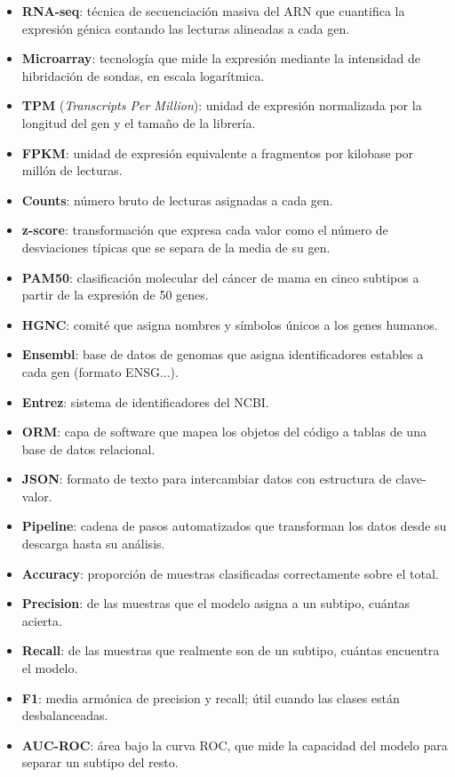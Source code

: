 \documentclass[12pt, a4paper]{report}
\begin{document}
\begin{itemize}
  \item \textbf{RNA-seq}: técnica de secuenciación masiva del ARN que cuantifica la expresión génica contando las lecturas alineadas a cada gen.
  \item \textbf{Microarray}: tecnología que mide la expresión mediante la intensidad de hibridación de sondas, en escala logarítmica.
  \item \textbf{TPM} (\textit{Transcripts Per Million}): unidad de expresión normalizada por la longitud del gen y el tamaño de la librería.
  \item \textbf{FPKM}: unidad de expresión equivalente a fragmentos por kilobase por millón de lecturas.
  \item \textbf{Counts}: número bruto de lecturas asignadas a cada gen.
  \item \textbf{z-score}: transformación que expresa cada valor como el número de desviaciones típicas que se separa de la media de su gen.
  \item \textbf{PAM50}: clasificación molecular del cáncer de mama en cinco subtipos a partir de la expresión de 50 genes.
  \item \textbf{HGNC}: comité que asigna nombres y símbolos únicos a los genes humanos.
  \item \textbf{Ensembl}: base de datos de genomas que asigna identificadores estables a cada gen (formato ENSG...).
  \item \textbf{Entrez}: sistema de identificadores del NCBI.
  \item \textbf{ORM}: capa de software que mapea los objetos del código a tablas de una base de datos relacional.
  \item \textbf{JSON}: formato de texto para intercambiar datos con estructura de clave-valor.
  \item \textbf{Pipeline}: cadena de pasos automatizados que transforman los datos desde su descarga hasta su análisis.
  \item \textbf{Accuracy}: proporción de muestras clasificadas correctamente sobre el total.
  \item \textbf{Precision}: de las muestras que el modelo asigna a un subtipo, cuántas acierta.
  \item \textbf{Recall}: de las muestras que realmente son de un subtipo, cuántas encuentra el modelo.
  \item \textbf{F1}: media armónica de precision y recall; útil cuando las clases están desbalanceadas.
  \item \textbf{AUC-ROC}: área bajo la curva ROC, que mide la capacidad del modelo para separar un subtipo del resto.

\end{itemize}
\end{document}

